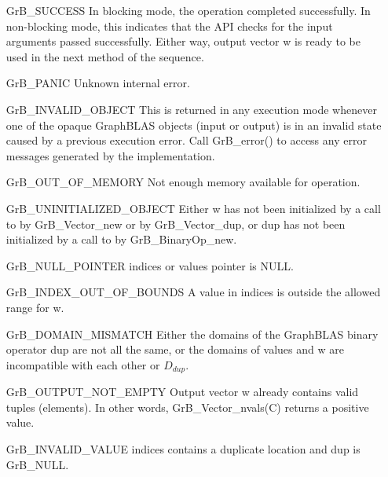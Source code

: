 \begin{itemize}[leftmargin=2.3in]
    \item[{\sf GrB\_SUCCESS}]         In blocking mode, the operation completed
    successfully. In non-blocking mode, this indicates that the API checks 
    for the input arguments passed successfully. Either way, output vector 
    {\sf w} is ready to be used in the next method of the sequence.

    \item[{\sf GrB\_PANIC}]           Unknown internal error.
    
    \item[{\sf GrB\_INVALID\_OBJECT}] This is returned in any execution mode 
    whenever one of the opaque GraphBLAS objects (input or output) is in an invalid 
    state caused by a previous execution error.  Call {\sf GrB\_error()} to access 
    any error messages generated by the implementation.

    \item[{\sf GrB\_OUT\_OF\_MEMORY}] Not enough memory available for operation.
    
    \item[{\sf GrB\_UNINITIALIZED\_OBJECT}]  Either {\sf w} has not been 
    initialized by a call to {\sf by GrB\_Vector\_new} or 
    {\sf by GrB\_Vector\_dup}, or
    {\sf dup} has not been initialized by a call to {\sf by GrB\_BinaryOp\_new}.
    
    \item[{\sf GrB\_NULL\_POINTER}]  {\sf indices} or {\sf values} 
    pointer is {\sf NULL}.

    \item[{\sf GrB\_INDEX\_OUT\_OF\_BOUNDS}] A value in {\sf indices} is outside 
    the allowed range for {\sf w}.
    
	\item[{\sf GrB\_DOMAIN\_MISMATCH}]    Either the domains of the GraphBLAS 
    binary operator {\sf dup} are not all the same, or the domains of 
    {\sf values} and {\sf w} are incompatible with each other or $D_{dup}$.
	
	\item[{\sf GrB\_OUTPUT\_NOT\_EMPTY}]    Output vector {\sf w} already contains valid tuples (elements).
	In other words, {\sf GrB\_Vector\_nvals(C)} returns a positive value.
    
    \item[{\sf GrB\_INVALID\_VALUE}] {\sf indices} contains a duplicate location
    and {\sf dup} is {\sf GrB\_NULL}. 
\end{itemize}

